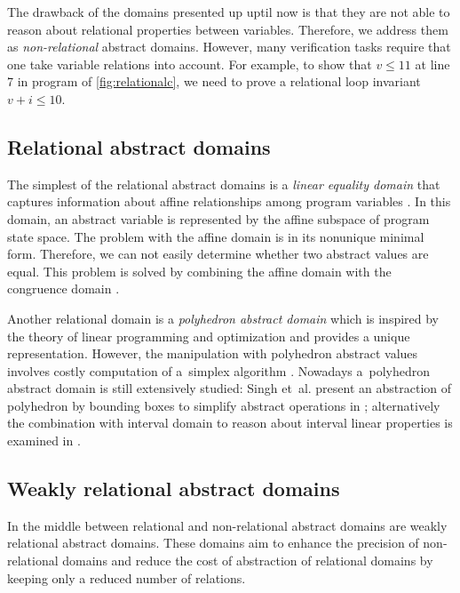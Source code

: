 The drawback of the domains presented up uptil now is that they are not able to reason about
relational properties between variables. Therefore, we address them as
\emph{non-relational} abstract domains.  However, many verification tasks
require that one take variable relations into account.  For example, to show that $v \leq 11$
at line 7 in program of \autoref{fig:relationalc}, we need to prove a
relational loop invariant $v + i
\leq 10$.


\subsection{Relational abstract domains}

The simplest of the relational abstract domains is a \emph{linear equality
domain} that captures information about affine relationships among program
variables \cite{Karr1976}. In this domain, an abstract variable is represented
by the affine subspace of program state space. The problem with the affine
domain is in its nonunique minimal form. Therefore, we can not easily determine
whether two abstract values are equal. This problem is solved by combining
the affine domain with the congruence domain \cite{Granger1991}.

Another relational domain is a \emph{polyhedron abstract domain} which is
inspired by the theory of linear programming and optimization \cite{Cousot1978, Venet2012}
and provides a unique representation. However, the manipulation with polyhedron
abstract values involves costly computation of a~simplex algorithm
\cite{Schrijver1986}. Nowadays a~polyhedron abstract domain is still
extensively studied: Singh et~al. present an abstraction of polyhedron by
bounding boxes to simplify abstract operations in \cite{Singh2017};
alternatively the combination with interval domain to reason about interval
linear properties is examined in \cite{Chen2009}.

\subsection{Weakly relational abstract domains}

In the middle between relational and non-relational abstract domains are
weakly relational abstract domains. These domains aim to enhance the precision
of non-relational domains and reduce the cost of abstraction of relational
domains by keeping only a reduced number of relations.

